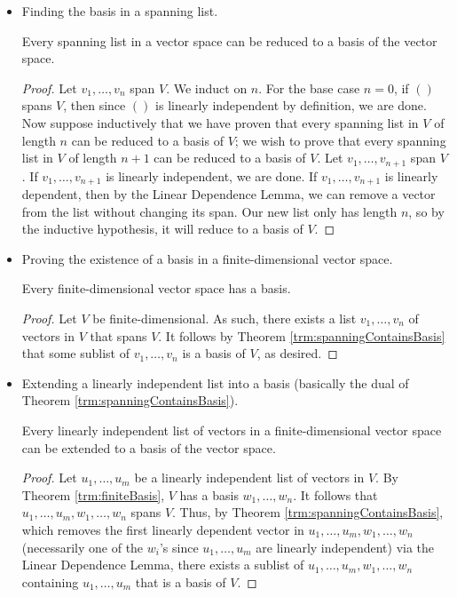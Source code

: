 \documentclass[../main.tex]{subfiles}
\begin{document}
\begin{itemize}
\begin{theorem}
\begin{proof}
        \end{proof}
    \end{theorem}
    \item Finding the basis in a spanning list.
    \begin{theorem}\label{trm:spanningContainsBasis}
        Every spanning list in a vector space can be reduced to a basis of the vector space.
        \begin{proof}
            Let $v_1,\dots,v_n$ span $V$. We induct on $n$. For the base case $n=0$, if $()$ spans $V$, then since $()$ is linearly independent by definition, we are done. Now suppose inductively that we have proven that every spanning list in $V$ of length $n$ can be reduced to a basis of $V$; we wish to prove that every spanning list in $V$ of length $n+1$ can be reduced to a basis of $V$. Let $v_1,\dots,v_{n+1}$ span $V$. If $v_1,\dots,v_{n+1}$ is linearly independent, we are done. If $v_1,\dots,v_{n+1}$ is linearly dependent, then by the Linear Dependence Lemma, we can remove a vector from the list without changing its span. Our new list only has length $n$, so by the inductive hypothesis, it will reduce to a basis of $V$.
        \end{proof}
    \end{theorem}
    \item Proving the existence of a basis in a finite-dimensional vector space.
    \begin{theorem}\label{trm:finiteBasis}
        Every finite-dimensional vector space has a basis.
        \begin{proof}
            Let $V$ be finite-dimensional. As such, there exists a list $v_1,\dots,v_n$ of vectors in $V$ that spans $V$. It follows by Theorem \ref{trm:spanningContainsBasis} that some sublist of $v_1,\dots,v_n$ is a basis of $V$, as desired.
        \end{proof}
    \end{theorem}
    \item Extending a linearly independent list into a basis (basically the dual of Theorem \ref{trm:spanningContainsBasis}).
    \begin{theorem}\label{trm:lnlIndependentExtendBasis}
        Every linearly independent list of vectors in a finite-dimensional vector space can be extended to a basis of the vector space.
        \begin{proof}
            Let $u_1,\dots,u_m$ be a linearly independent list of vectors in $V$. By Theorem \ref{trm:finiteBasis}, $V$ has a basis $w_1,\dots,w_n$. It follows that $u_1,\dots,u_m,w_1,\dots,w_n$ spans $V$. Thus, by Theorem \ref{trm:spanningContainsBasis}, which removes the first linearly dependent vector in $u_1,\dots,u_m,w_1,\dots,w_n$ (necessarily one of the $w_i$'s since $u_1,\dots,u_m$ are linearly independent) via the Linear Dependence Lemma, there exists a sublist of $u_1,\dots,u_m,w_1,\dots,w_n$ containing $u_1,\dots,u_m$ that is a basis of $V$.

\end{proof}
\end{theorem}
\end{itemize}
\end{document}
